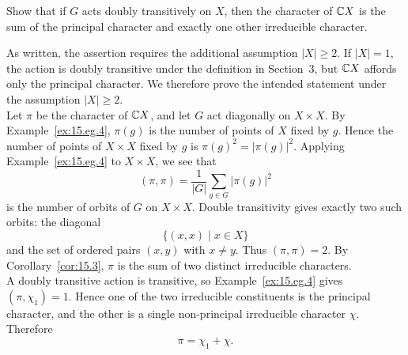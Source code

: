 \documentclass[../Odyssey_Project.tex]{subfiles}
\begin{document}
\begin{exercise}
\label{ex:15.8}
Show that if $G$ acts doubly transitively on $X$, then the character of $\mathbb{C} X$ is the sum of the principal character and exactly one other irreducible character.
\end{exercise}
\begin{solution}
    As written, the assertion requires the additional assumption $|X|\geq2$. If $|X|=1$, the action is doubly transitive under the definition in Section~3, but $\mathbb{C} X$ affords only the principal character. We therefore prove the intended statement under the assumption $|X|\geq2$.\\
    Let $\pi$ be the character of $\mathbb{C} X$, and let $G$ act diagonally on $X\times X$. By Example~\ref{ex:15.eg.4}, $\pi(g)$ is the number of points of $X$ fixed by $g$. Hence the number of points of $X\times X$ fixed by $g$ is $\pi(g)^2=|\pi(g)|^2$. Applying Example~\ref{ex:15.eg.4} to $X\times X$, we see that
    \[
        (\pi,\pi)
        =
        \frac{1}{|G|}\sum_{g\in G}|\pi(g)|^2
    \]
    is the number of orbits of $G$ on $X\times X$. Double transitivity gives exactly two such orbits: the diagonal
    \[
        \{(x,x)\mid x\in X\}
    \]
    and the set of ordered pairs $(x,y)$ with $x\neq y$. Thus $(\pi,\pi)=2$. By Corollary~\ref{cor:15.3}, $\pi$ is the sum of two distinct irreducible characters.\\
    A doubly transitive action is transitive, so Example~\ref{ex:15.eg.4} gives $(\pi,\chi_1)=1$. Hence one of the two irreducible constituents is the principal character, and the other is a single non-principal irreducible character $\chi$. Therefore
    \[
        \pi=\chi_1+\chi.
    \]
\end{solution}
\end{document}
